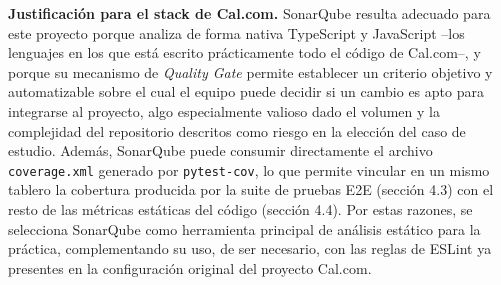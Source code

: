 \documentclass[12pt,a4paper]{article}
\begin{document}
\textbf{Justificación para el stack de Cal.com.} SonarQube resulta
adecuado para este proyecto porque analiza de forma nativa
TypeScript y JavaScript --los lenguajes en los que está escrito
prácticamente todo el código de Cal.com--, y porque su mecanismo de
\emph{Quality Gate} permite establecer un criterio objetivo y
automatizable sobre el cual el equipo puede decidir si un cambio es
apto para integrarse al proyecto, algo especialmente valioso dado el
volumen y la complejidad del repositorio descritos como riesgo en la
elección del caso de estudio. Además, SonarQube puede consumir
directamente el archivo \texttt{coverage.xml} generado por
\texttt{pytest-cov}, lo que permite vincular en un mismo tablero la
cobertura producida por la suite de pruebas E2E (sección 4.3) con el
resto de las métricas estáticas del código (sección 4.4). Por estas
razones, se selecciona SonarQube como herramienta principal de
análisis estático para la práctica, complementando su uso, de ser
necesario, con las reglas de ESLint ya presentes en la configuración
original del proyecto Cal.com.

%
\end{document}
